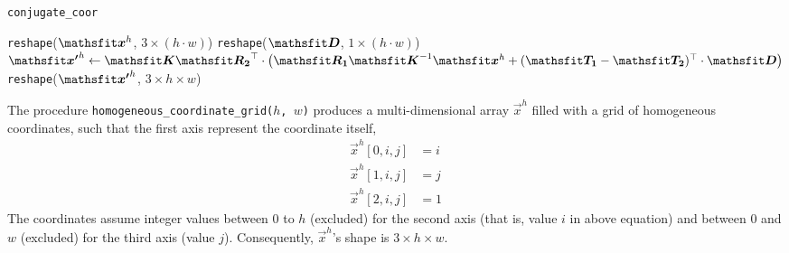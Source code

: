 \begin{algorithm}
	\caption{\texttt{conjugate\_coor}}
	\label{alg:conjugate_coor}
	
	\begin{algorithmic}[1]
		\State \texttt{reshape}($\mat{x}^h$, $3\times (h\cdot w)$) 
		\State \texttt{reshape}($\mat{D}$, $1\times(h\cdot w)$)
		\State $\mat {x'}^h \leftarrow \mat K\Transpose{\mat{R_2}}\cdot\left(
			\mat{R_1}\Inverse{\mat K}\vec x^h + 
			\Transpose{(\mat{T_1}-\mat{T_2})} \cdot \mat D
		\right)$
		\State \texttt{reshape}($\mat{x'}^h$, $3\times h\times w$) 
		\EndProcedure
	\end{algorithmic}
\end{algorithm}

\begin{FunctionBlock}
The procedure \texttt{homogeneous\_coordinate\_grid($h$, $w$)} produces a multi-dimensional array $\vec x^h$ filled with a grid of homogeneous coordinates, such that the first axis represent the coordinate itself, \ie
\begin{align*}
\vec x^h[0,i,j] &= i\\
\vec x^h[1,i,j] &= j\\
\vec x^h[2,i,j] &= 1
\end{align*}
The coordinates assume integer values between $0$ to $h$ (excluded) for the second axis (that is, value $i$ in above equation) and between $0$ and $w$ (excluded) for the third axis (value $j$). Consequently, $\vec x^h$'s shape is $3\times h \times w$.
\end{FunctionBlock}

